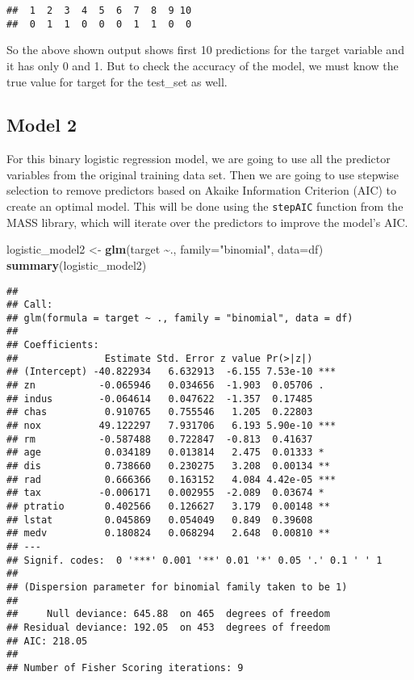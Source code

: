 \documentclass[
]{article}
\newenvironment{Shaded}{\begin{snugshade}}{\end{snugshade}}
\newcommand{\AttributeTok}[1]{\textcolor[rgb]{0.13,0.29,0.53}{#1}}
\newcommand{\FunctionTok}[1]{\textcolor[rgb]{0.13,0.29,0.53}{\textbf{#1}}}
\newcommand{\NormalTok}[1]{#1}
\newcommand{\OtherTok}[1]{\textcolor[rgb]{0.56,0.35,0.01}{#1}}
\newcommand{\SpecialCharTok}[1]{\textcolor[rgb]{0.81,0.36,0.00}{\textbf{#1}}}
\newcommand{\StringTok}[1]{\textcolor[rgb]{0.31,0.60,0.02}{#1}}
\begin{document}
\begin{verbatim}
##  1  2  3  4  5  6  7  8  9 10 
##  0  1  1  0  0  0  1  1  0  0
\end{verbatim}

So the above shown output shows first 10 predictions for the target
variable and it has only 0 and 1. But to check the accuracy of the
model, we must know the true value for target for the test\_set as well.

\hypertarget{model-2}{%
\subsection{Model 2}\label{model-2}}

For this binary logistic regression model, we are going to use all the
predictor variables from the original training data set. Then we are
going to use stepwise selection to remove predictors based on Akaike
Information Criterion (AIC) to create an optimal model. This will be
done using the \texttt{stepAIC} function from the MASS library, which
will iterate over the predictors to improve the model's AIC.

\begin{Shaded}
\begin{Highlighting}[]
\NormalTok{logistic\_model2 }\OtherTok{\textless{}{-}} \FunctionTok{glm}\NormalTok{(target }\SpecialCharTok{\textasciitilde{}}\NormalTok{., }\AttributeTok{family=}\StringTok{"binomial"}\NormalTok{, }\AttributeTok{data=}\NormalTok{df)}
\FunctionTok{summary}\NormalTok{(logistic\_model2)}
\end{Highlighting}
\end{Shaded}

\begin{verbatim}
## 
## Call:
## glm(formula = target ~ ., family = "binomial", data = df)
## 
## Coefficients:
##               Estimate Std. Error z value Pr(>|z|)    
## (Intercept) -40.822934   6.632913  -6.155 7.53e-10 ***
## zn           -0.065946   0.034656  -1.903  0.05706 .  
## indus        -0.064614   0.047622  -1.357  0.17485    
## chas          0.910765   0.755546   1.205  0.22803    
## nox          49.122297   7.931706   6.193 5.90e-10 ***
## rm           -0.587488   0.722847  -0.813  0.41637    
## age           0.034189   0.013814   2.475  0.01333 *  
## dis           0.738660   0.230275   3.208  0.00134 ** 
## rad           0.666366   0.163152   4.084 4.42e-05 ***
## tax          -0.006171   0.002955  -2.089  0.03674 *  
## ptratio       0.402566   0.126627   3.179  0.00148 ** 
## lstat         0.045869   0.054049   0.849  0.39608    
## medv          0.180824   0.068294   2.648  0.00810 ** 
## ---
## Signif. codes:  0 '***' 0.001 '**' 0.01 '*' 0.05 '.' 0.1 ' ' 1
## 
## (Dispersion parameter for binomial family taken to be 1)
## 
##     Null deviance: 645.88  on 465  degrees of freedom
## Residual deviance: 192.05  on 453  degrees of freedom
## AIC: 218.05
## 
## Number of Fisher Scoring iterations: 9
\end{verbatim}
\end{document}
